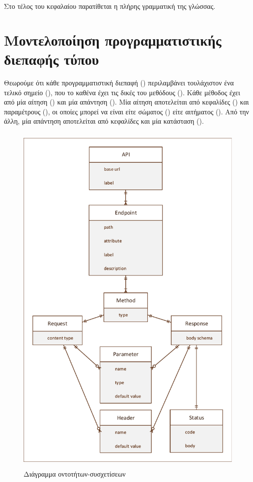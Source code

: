 Στο τέλος του κεφαλαίου παρατίθεται η πλήρης γραμματική της γλώσσας.

\section{Μοντελοποίηση προγραμματιστικής διεπαφής τύπου }
Θεωρούμε ότι κάθε προγραμματιστική διεπαφή () περιλαμβάνει τουλάχιστον ένα τελικό σημείο (), 
που το καθένα έχει τις δικές του μεθόδους ().
Κάθε μέθοδος έχει από μία αίτηση () και μία απάντηση ().
Μία αίτηση αποτελείται από κεφαλίδες () και παραμέτρους (), 
οι οποίες μπορεί να είναι είτε σώματος () είτε αιτήματος ().
Από την άλλη,
μία απάντηση αποτελείται από κεφαλίδες και μία κατάσταση ().

\begin{figure}[!b]
    \centering
	\includegraphics[height=18cm,keepaspectratio]{figures/ERD_eng.pdf} 
    \caption{Διάγραμμα οντοτήτων-συσχετίσεων}
    \label{figure3.2}
\end{figure} 

